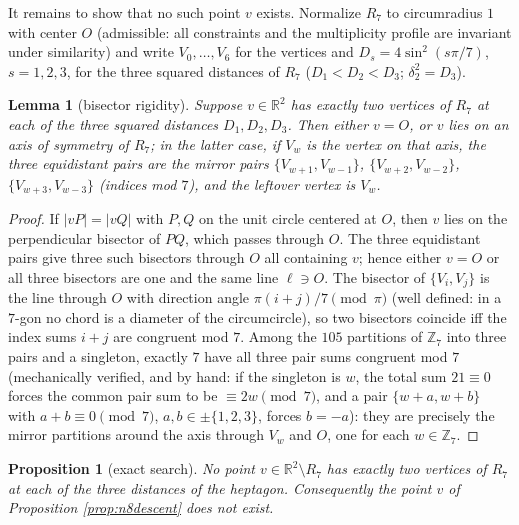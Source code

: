 \documentclass[11pt]{article}
\newtheorem{lemma}[theorem]{Lemma}
\newtheorem{proposition}[theorem]{Proposition}
\theoremstyle{definition}
\theoremstyle{remark}
\newcommand{\R}{\mathbb{R}}
\newcommand{\Z}{\mathbb{Z}}
\begin{document}
It remains to show that no such point $v$ exists. Normalize $R_7$ to circumradius $1$
with center $O$ (admissible: all constraints and the multiplicity profile are invariant
under similarity) and write $V_0, \dots, V_6$ for the vertices and
$D_s = 4\sin^2(s\pi/7)$, $s = 1, 2, 3$, for the three squared distances of $R_7$
($D_1 < D_2 < D_3$; $\delta_2^2 = D_3$).

\begin{lemma}[bisector rigidity]\label{lem:bisector}
Suppose $v \in \R^2$ has exactly two vertices of $R_7$ at each of the three squared
distances $D_1, D_2, D_3$. Then either
$v = O$, or $v$ lies on an axis of symmetry of $R_7$; in the latter case, if $V_w$ is
the vertex on that axis, the three equidistant pairs are the mirror pairs
$\{V_{w+1}, V_{w-1}\}$, $\{V_{w+2}, V_{w-2}\}$, $\{V_{w+3}, V_{w-3}\}$ (indices mod
$7$), and the leftover vertex is $V_w$.
\end{lemma}

\begin{proof}
If $|vP| = |vQ|$ with $P, Q$ on the unit circle centered at $O$, then $v$ lies on the
perpendicular bisector of $PQ$, which passes through $O$. The three equidistant pairs
give three such bisectors through $O$ all containing $v$; hence either $v = O$ or all
three bisectors are one and the same line $\ell \ni O$. The bisector of
$\{V_i, V_j\}$ is the line through $O$ with direction angle $\pi(i+j)/7 \pmod{\pi}$
(well defined: in a $7$-gon no chord is a diameter of the circumcircle), so two
bisectors coincide iff the index sums $i+j$ are congruent mod $7$. Among the $105$
partitions of $\Z_7$ into three pairs and a singleton, exactly $7$ have all three pair
sums congruent mod $7$ (mechanically verified, and by hand: if the singleton is $w$,
the total sum $21 \equiv 0$ forces the common pair sum to be $\equiv 2w \pmod 7$, and a
pair $\{w+a, w+b\}$ with $a + b \equiv 0 \pmod 7$, $a, b \in \pm\{1,2,3\}$, forces
$b = -a$): they are precisely the mirror partitions around the axis through $V_w$ and
$O$, one for each $w \in \Z_7$.
\end{proof}

\begin{proposition}[exact search]\label{prop:n8search}
No point $v \in \R^2 \setminus R_7$ has exactly two vertices of $R_7$ at each of the
three distances of the heptagon. Consequently the point $v$ of Proposition
\ref{prop:n8descent} does not exist.
\end{proposition}
\end{document}

